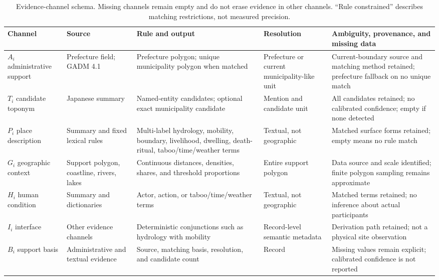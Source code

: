 \documentclass{isprs}
\begin{document}
\begin{table}[t]
\centering
\small
\setlength{\tabcolsep}{4pt}
\begin{tabular}{p{}p{}p{}p{}p{}}
\toprule
Channel & Source & Rule and output & Resolution & Ambiguity, provenance, and missing data \\
\midrule
\(A_i\) administrative support & Prefecture field; GADM 4.1 & Prefecture polygon; unique municipality polygon when matched & Prefecture or current municipality-like unit & Current-boundary source and matching method retained; prefecture fallback on no unique match \\
\(T_i\) candidate toponym & Japanese summary & Named-entity candidates; optional exact municipality candidate & Mention and candidate unit & All candidates retained; no calibrated confidence; empty if none detected \\
\(P_i\) place description & Summary and fixed lexical rules & Multi-label hydrology, mobility, boundary, livelihood, dwelling, death-ritual, taboo/time/weather terms & Textual, not geographic & Matched surface forms retained; empty means no rule match \\
\(G_i\) geographic context & Support polygon, coastline, rivers, lakes & Continuous distances, densities, shares, and threshold proportions & Entire support polygon & Data source and scale identified; finite polygon sampling remains approximate \\
\(H_i\) human condition & Summary and dictionaries & Actor, action, or taboo/time/weather terms & Textual, not geographic & Matched terms retained; no inference about actual participants \\
\(I_i\) interface & Other evidence channels & Deterministic conjunctions such as hydrology with mobility & Record-level semantic metadata & Derivation path retained; not a physical site observation \\
\(B_i\) support basis & Administrative and textual evidence & Source, matching basis, resolution, and candidate count & Record & Missing values remain explicit; calibrated confidence is not reported \\
\bottomrule
\end{tabular}
\caption{Evidence-channel schema. Missing channels remain empty and do not erase evidence in other channels. ``Rule constrained'' describes matching restrictions, not measured precision.}
\label{tab:model}
\end{table}
\end{document}
